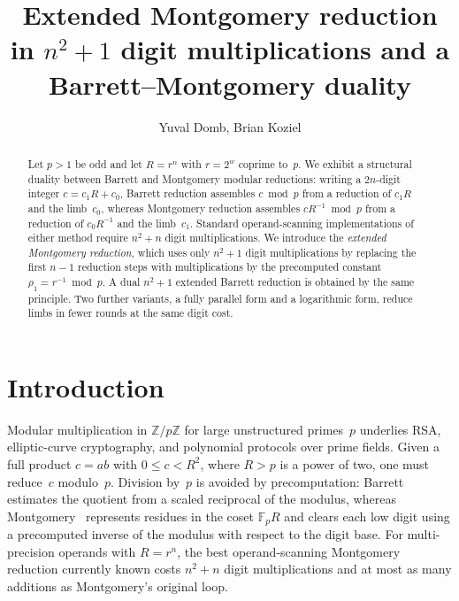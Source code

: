 \documentclass[reqno]{amsart}
\title[Extended Montgomery reduction in $n^2+1$ digit multiplications]{Extended Montgomery reduction in $n^2+1$ digit multiplications and a Barrett--Montgomery duality}
\author{Yuval Domb, Brian Koziel}
\theoremstyle{definition}
\begin{document}
\begin{abstract}
Let $p>1$ be odd and let $R=r^n$ with $r=2^w$ coprime to~$p$.
We exhibit a structural duality between Barrett and Montgomery modular reductions:
writing a $2n$-digit integer $c=c_1R+c_0$, Barrett reduction assembles $c\bmod p$ from a reduction of $c_1R$ and the limb~$c_0$, whereas Montgomery reduction assembles $cR^{-1}\bmod p$ from a reduction of $c_0R^{-1}$ and the limb~$c_1$.
Standard operand-scanning implementations of either method require $n^2+n$ digit multiplications.
We introduce the \emph{extended Montgomery reduction}, which uses only $n^2+1$ digit multiplications by replacing the first $n-1$ reduction steps with multiplications by the precomputed constant $\rho_1 = r^{-1}\bmod p$.
A dual $n^2+1$ extended Barrett reduction is obtained by the same principle.
Two further variants, a fully parallel form and a logarithmic form, reduce limbs in fewer rounds at the same digit cost.
\end{abstract}


\maketitle

\section{Introduction}

Modular multiplication in $\mathbb{Z}/p\mathbb{Z}$ for large unstructured primes~$p$ underlies RSA, elliptic-curve cryptography, and polynomial protocols over prime fields.
Given a full product $c=ab$ with $0\le c<R^2$, where $R> p$ is a power of two, one must reduce~$c$ modulo~$p$.
Division by~$p$ is avoided by precomputation: Barrett~\cite{barrett} estimates the quotient from a scaled reciprocal of the modulus, whereas Montgomery~\cite{montgomery} represents residues in the coset $\mathbb{F}_p R$ and clears each low digit using a precomputed inverse of the modulus with respect to the digit base.
For multi-precision operands with $R=r^n$, the best operand-scanning Montgomery reduction currently known costs $n^2+n$ digit multiplications and at most as many additions as Montgomery's original loop.
\end{document}
